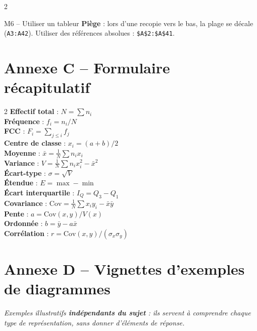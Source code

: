 \documentclass[11pt,a4paper]{article}
\begin{document}
\begin{multicols}{2}
\begin{vignetteMethode}{M6 -- Utiliser un tableur}
\medskip
\textbf{Piège} : lors d'une recopie vers le bas, la plage se décale (\texttt{A3:A42}). Utiliser des références absolues : \texttt{\$A\$2:\$A\$41}.
\end{vignetteMethode}

\end{multicols}

\vspace{0.3cm}

\section*{\color{biocolor}Annexe C -- Formulaire récapitulatif}
\begin{vignetteFormule}
\begin{multicols}{2}
\noindent\textbf{Effectif total} : $N=\sum n_i$\\
\textbf{Fréquence} : $f_i = n_i/N$\\
\textbf{FCC} : $F_i = \sum_{j\le i} f_j$\\
\textbf{Centre de classe} : $x_i=(a+b)/2$\\
\textbf{Moyenne} : $\bar{x}=\frac{1}{N}\sum n_i x_i$\\
\textbf{Variance} : $V=\frac{1}{N}\sum n_i x_i^2-\bar{x}^2$\\
\textbf{Écart-type} : $\sigma=\sqrt{V}$\\
\textbf{Étendue} : $E=\max-\min$\\
\textbf{Écart interquartile} : $I_Q=Q_3-Q_1$\\
\textbf{Covariance} : $\mathrm{Cov}=\frac{1}{N}\sum x_i y_i-\bar{x}\bar{y}$\\
\textbf{Pente} : $a=\mathrm{Cov}(x,y)/V(x)$\\
\textbf{Ordonnée} : $b=\bar{y}-a\bar{x}$\\
\textbf{Corrélation} : $r=\mathrm{Cov}(x,y)/(\sigma_x\sigma_y)$
\end{multicols}
\end{vignetteFormule}

\newpage

\section*{\color{biocolor}Annexe D -- Vignettes d'exemples de diagrammes}
\emph{Exemples illustratifs \textbf{indépendants du sujet} : ils servent à comprendre chaque type de représentation, sans donner d'éléments de réponse.}
\end{document}
